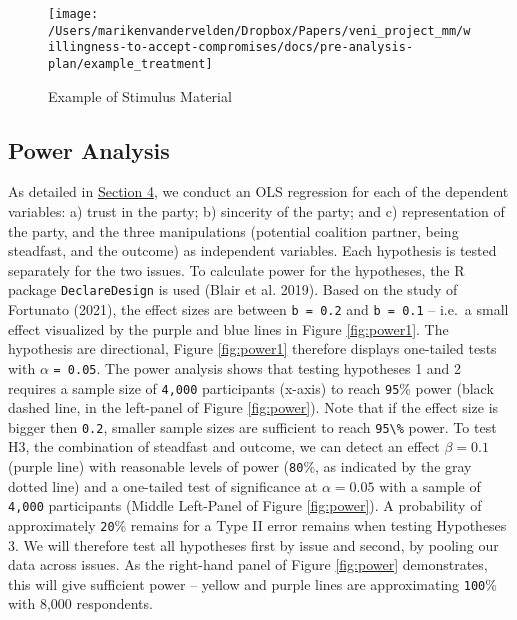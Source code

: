 \documentclass[]{article}
\begin{document}
\begin{figure}

{\centering \texttt{[image: /Users/marikenvandervelden/Dropbox/Papers/veni\_project\_mm/willingness-to-accept-compromises/docs/pre-analysis-plan/example\_treatment]} 

}

\caption{\label{fig:treatment_example}Example of Stimulus Material}\label{fig:treatment-example}
\end{figure}

\hypertarget{power-analysis}{%
\subsection{Power Analysis}\label{power-analysis}}

As detailed in \protect\hyperlink{analysis}{Section 4}, we conduct an
OLS regression for each of the dependent variables: a) trust in the
party; b) sincerity of the party; and c) representation of the party,
and the three manipulations (potential coalition partner, being
steadfast, and the outcome) as independent variables. Each hypothesis is
tested separately for the two issues. To calculate power for the
hypotheses, the R package \texttt{DeclareDesign} is used (Blair et al.
2019). Based on the study of Fortunato (2021), the effect sizes are
between \texttt{b\ =\ 0.2} and \texttt{b\ =\ 0.1} -- i.e.~a small effect
visualized by the purple and blue lines in Figure \ref{fig:power1}. The
hypothesis are directional, Figure \ref{fig:power1} therefore displays
one-tailed tests with \(\alpha\) \texttt{=\ 0.05}. The power analysis
shows that testing hypotheses 1 and 2 requires a sample size of
\texttt{4,000} participants (x-axis) to reach \texttt{95}\% power (black
dashed line, in the left-panel of Figure \ref{fig:power}). Note that if
the effect size is bigger then \texttt{0.2}, smaller sample sizes are
sufficient to reach \texttt{95\textbackslash{}\%} power. To test H3, the
combination of steadfast and outcome, we can detect an effect
\(\beta = 0.1\) (purple line) with reasonable levels of power
(\texttt{80}\%, as indicated by the gray dotted line) and a one-tailed
test of significance at \(\alpha =0.05\) with a sample of \texttt{4,000}
participants (Middle Left-Panel of Figure \ref{fig:power}). A
probability of approximately \texttt{20}\% remains for a Type II error
remains when testing Hypotheses 3. We will therefore test all hypotheses
first by issue and second, by pooling our data across issues. As the
right-hand panel of Figure \ref{fig:power} demonstrates, this will give
sufficient power -- yellow and purple lines are approximating
\texttt{100}\% with 8,000 respondents.
\end{document}
